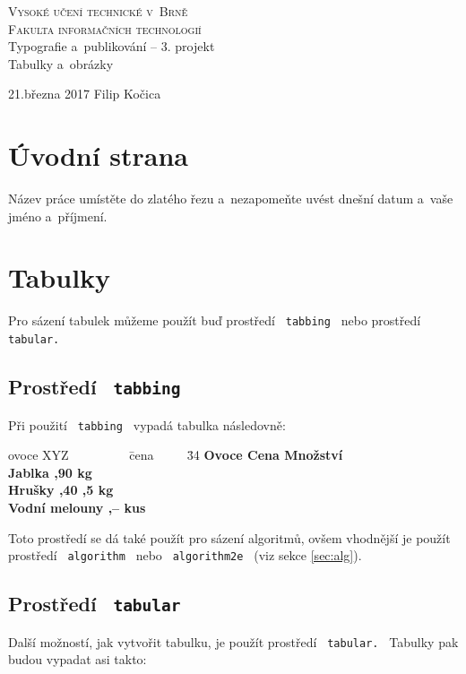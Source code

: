 \documentclass[11pt, titlepage, a4paper]{article}
\begin{document}
		\begin{titlepage}
    \begin{center}
		\textsc{\Huge{Vysoké učení technické v~Brně\\}
		\huge{Fakulta informačních technologií\\}}
		\LARGE{Typografie a~publikování -- 3. projekt\\}
		\Huge{Tabulky a~obrázky\\}
		\end{center}
		\Large{21.března 2017 \hfill Filip Kočica}
		\end{titlepage}

		\section{Úvodní strana}
			Název práce umístěte do zlatého řezu a~nezapomeňte uvést dnešní datum a~vaše jméno
			a~příjmení.

		  \section{Tabulky}
			  Pro sázení tabulek můžeme použít buď prostředí  \texttt{ tabbing }  nebo prostředí
			   \texttt{ tabular.}

		  \subsection{Prostředí  \texttt{ tabbing }}
			  Při použití  \texttt{ tabbing }  vypadá tabulka následovně:

	    \begin{tabbing}
      ovoce XYZ ~~~~~~~~~\= cena ~~~~
      \= 34 \kill
      \bfseries \textbf{Ovoce} \>
      \bfseries \textbf{Cena} \>
      \bfseries \textbf{Množství} \\[1mm]
      Jablka ,90  kg\\
      Hrušky ,40 ,5 kg\\
      Vodní melouny ,--  kus
      \end{tabbing}

		  \noindent
		  Toto prostředí se dá také použít pro sázení algoritmů, ovšem vhodnější je použít
		  prostředí  \texttt{ algorithm }  nebo  \texttt{ algorithm2e }  (viz sekce
		  \ref{sec:alg}).

		  \subsection{Prostředí  \texttt{ tabular}}
			  Další možností, jak vytvořit tabulku, je použít prostředí  \texttt{ tabular. } Tabulky
			  pak budou vypadat asi takto\footnotemark[1]:
\end{document}
